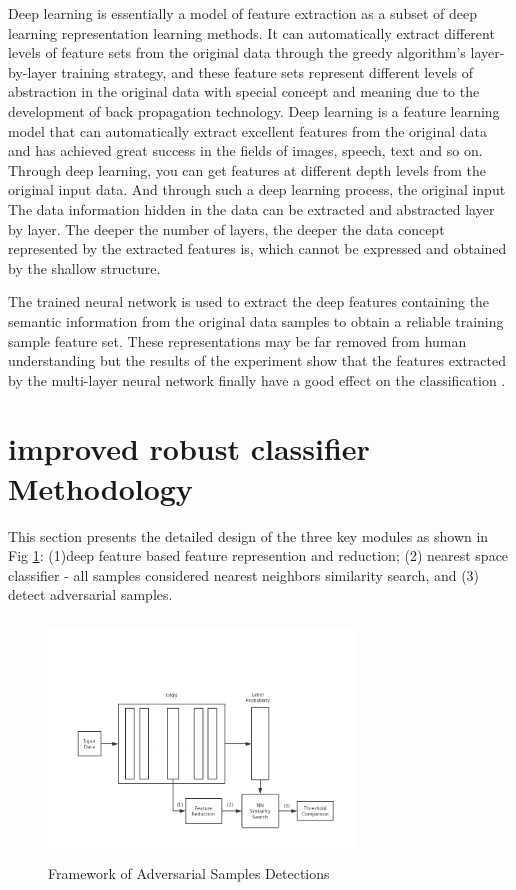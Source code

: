 \documentclass{ieeeaccess}
\begin{document}
Deep learning is essentially a model of feature extraction as a subset of deep learning representation learning methods. It can automatically extract different levels of feature sets from the original data through the greedy algorithm's layer-by-layer training strategy, and these feature sets represent different levels of abstraction in the original data with special concept and meaning due to the development of back propagation technology.
Deep learning is a feature learning model that can automatically extract excellent features from the original data and has achieved great success in the fields of images, speech, text and so on. Through deep learning, you can get features at different depth levels from the original input data. And through such a deep learning process, the original input The data information hidden in the data can be extracted and abstracted layer by layer. The deeper the number of layers, the deeper the data concept represented by the extracted features is, which cannot be expressed and obtained by the shallow structure.

The trained neural network is used to extract the deep features containing the semantic information from the original data samples to obtain a reliable training sample feature set. These representations may be far removed from human understanding \cite{sani2017learning} but the results of the experiment show that the features extracted by the multi-layer neural network finally have a good effect on the classification \cite{chandrasekhar2016practical}. 

\section{improved robust classifier Methodology}

This section presents the detailed design of the three key modules as shown in Fig \ref{deepfeature}: (1)deep feature based feature represention and reduction; (2) nearest space classifier - all samples considered nearest neighbors similarity search, and (3) detect adversarial samples.

\begin{figure}
	\centering
	\includegraphics[width=3.2in,height=2.5in]{fig//fw1.jpg}
	\caption{Framework of Adversarial Samples Detections}
	\label{deepfeature}
\end{figure}
\end{document}

